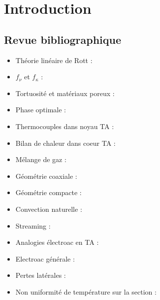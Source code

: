 \chapter{Introduction}\label{chap:Intro}%
\mylocaltoc

\section{Revue bibliographique}

\begin{itemize}
    \item Théorie linéaire de Rott : \cite{rott_damped_1969, rott_thermally_1973, rott_thermally_1975, rott_thermally_1976, zouzoulas_thermally_1976, rott_thermoacoustics_1980, muller_thermally_1983} 
    \item $f_\nu$ et $f_\kappa$ : \cite{swift_thermoacoustics_2017,di_giulio_wire_2023}
    \item Tortuosité et matériaux poreux : \cite{johnson_theory_1987}
    \item Phase optimale : \cite{poignand_etude_2006}
    \item Thermocouples dans noyau TA : \cite{duffourd_refrigerateur_2001, penelet_etude_2004}
    \item Bilan de chaleur dans coeur TA : \cite{penelet_etude_2004}
    \item Mélange de gaz : \cite{belcher_working_1999}
    \item Géométrie coaxiale : \cite{poignand_analysis_2013, poignand_thermoacoustic_2011, tijani_study_2008, ramadan_design_2021}
    \item Géométrie compacte : \cite{poignand_etude_2006}
    \item Convection naturelle : \cite{ross_influence_2003, hireche_numerical_2019, pan_visualization_2012, bianchi_transferts_2004,babaei_investigation_2010}
    \item Streaming : \cite{so_internal_2006, bailliet_acoustic_2001, ramadan_experimental_2018}
    \item Analogies électroac en TA : \cite{wakeland_use_2000, backhaus_thermoacoustic-stirling_2000, poignand_analysis_2013}
    \item Electroac générale : \cite{rossi_electroacoustique_1986, novak_measurement_2019}
    \item Pertes latérales : \cite{penelet_etude_2004, guedra_etudes_2012}
    \item Non uniformité de température sur la section : \cite{penelet_etude_2004}
\end{itemize}

